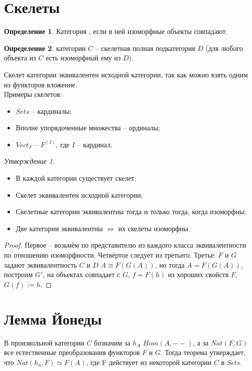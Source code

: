 \documentclass[a4paper]{article}
\theoremstyle{indented}
\theoremstyle{definition}
\newtheorem{defn}{Определение}
\theoremstyle{remark}
\newtheorem{stat}{Утверждение}
\begin{document}
\section{Скелеты}
\begin{defn}
Категория , если в ней изоморфные объекты совпадают.
\end{defn}
\begin{defn}
 категории $C$ -- скелетная полная подкатегория $D$ (для любого объекта из $C$ есть изоморфный ему из $D$).
\end{defn}
\remark Скелет категории эквивалентен исходной категории, так как можно взять одним из функторов вложение.
\\Примеры скелетов: \begin{itemize}
\item $Sets$ -- кардиналы;
\item Вполне упорядоченные множества -- ординалы;
\item $Vect_F$ -- $F^{(I)}$, где $I$ -- кардинал.
\end{itemize}
\begin{stat} \begin{itemize}
\item В каждой категории существует скелет;
\item Скелет эквивалентен исходной категории;
\item Скелетные категории эквивалентны тогда и только тогда, когда изоморфны;
\item Две категории эквивалентны $\Leftrightarrow$ их скелеты изоморфны.
\end{itemize}
\end{stat}
\begin{proof}
Первое -- возьмём по представителю из каждого класса эквивалентности по отношению изоморфности. Четвёртое следует из третьего. Третье: $F$ и $G$ задают эквивалентность $C$ и $D$ $A \cong F(G(A))$, но тогда $A = F(G(A))$, построим $G'$, на объектах совпадает с $G$, $f = F(h)$ из хороших свойств $F$, $G(f) := h$.
\end{proof}

\section{Лемма Йонеды}
\lemma {} В произвольной категории $C$ бозначим за $h_A$  $Hom(A, --)$, а за $Nat(F, G)$ все естественные преобразования функторов $F$ и $G$. Тогда теорема утверждает, что $Nat(h_a, F) \simeq F(A)$, где F действует из некоторой категории $C$ в $Sets$. \\
\end{document}
